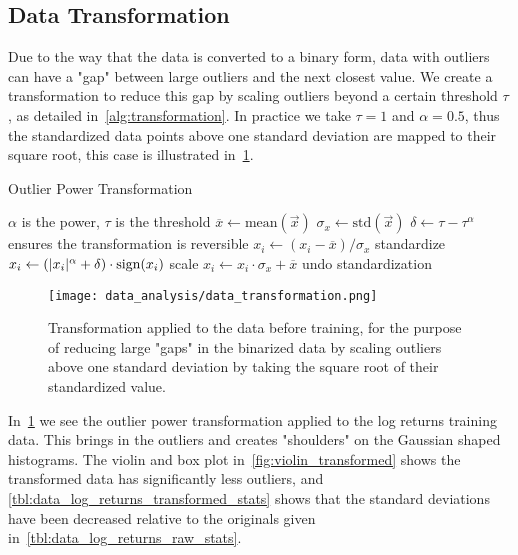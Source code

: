 \subsection{Data Transformation}
Due to the way that the data is converted to a binary form, data with outliers can have a "gap" between large outliers and the next closest value.
We create a transformation to reduce this gap by scaling outliers beyond a certain threshold \( \tau \), as detailed in~\cref{alg:transformation}.
In practice we take \( \tau = 1 \) and \( \alpha = 0.5 \), thus the standardized data points above one standard deviation are mapped to their square root, this case is illustrated in~\cref{fig:data_transformation}.
\begin{algorithm}
    \caption{Outlier Power Transformation}
\begin{algorithmic}[1]
            \Comment $\alpha$ is the power, $\tau$ is the threshold
        \State $\overline{x} \gets \text{mean}(\vec{x})$
        \State $\sigma_{x} \gets \text{std}(\vec{x})$
        \State $\delta \gets \tau - \tau^\alpha$
            \Comment ensures the transformation is reversible
            \State $x_i \gets (x_i - \overline{x}) / \sigma_x$
                \Comment standardize
            \State $x_i \gets (\lvert x_i\rvert^\alpha + \delta) \cdot \text{sign}(x_i)$
                \Comment scale
            \State $x_i \gets x_i \cdot \sigma_x + \overline{x}$
                \Comment undo standardization
        \EndFor
    \EndProcedure
\end{algorithmic}
\label{alg:transformation}
\end{algorithm}

\begin{figure}[!htb]
    \begin{center}
        \texttt{[image: data\_analysis/data\_transformation.png]}
    \end{center}
    \caption{Transformation applied to the data before training, for the purpose of reducing large "gaps" in the binarized data by scaling outliers above one standard deviation by taking the square root of their standardized value.}
    \label{fig:data_transformation}
\end{figure}

In~\cref{fig:data_transformation} we see the outlier power transformation applied to the log returns training data.
This brings in the outliers and creates "shoulders" on the Gaussian shaped histograms.
The violin and box plot in~\cref{fig:violin_transformed} shows the transformed data has significantly less outliers, and \cref{tbl:data_log_returns_transformed_stats} shows that the standard deviations have been decreased relative to the originals given in~\cref{tbl:data_log_returns_raw_stats}.


